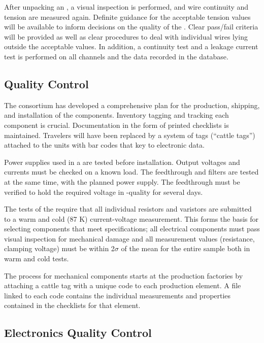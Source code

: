 After unpacking an , a visual inspection is performed, and
wire continuity and tension are measured again. Definite
guidance for the acceptable tension values will be available to inform
decisions on the quality of the . Clear pass/fail criteria will be
provided as well as clear procedures to deal with individual wires
lying outside the acceptable values. In addition, a continuity test
and a leakage current test is performed on all channels and the data
recorded in the database.

\subsection{ Quality Control}

The  consortium has developed a comprehensive 
plan for the production, shipping, and installation of the
  components. Inventory tagging and tracking
each component is crucial. Documentation in the form of printed
checklists is maintained. Travelers will have been replaced by a system
of tags (``cattle tags'') attached to the units with bar codes that 
key to electronic  data. 

Power supplies used in a  are tested before
installation. Output voltages and currents must be checked on a known
load. The feedthrough and filters are tested at the same time,
with the planned power supply. The feedthrough must be verified to
hold the required voltage in -quality  for several days.

The  tests of the  %
require that all
individual resistors and varistors are submitted to a warm and cold
(87 K) current-voltage measurement. This forms the basis for selecting
components that meet specifications; all electrical components must
pass visual inspection for mechanical damage and all measurement values
(resistance, clamping voltage) must be within 2$\sigma$ of the mean for the
entire sample both in warm and cold tests.

The  process for mechanical components starts at the production
factories by attaching a cattle tag with a unique code to each
production element. A file linked to each code contains the individual
measurements and properties contained in the  checklists for that
element.

\subsection{ Electronics Quality Control}

